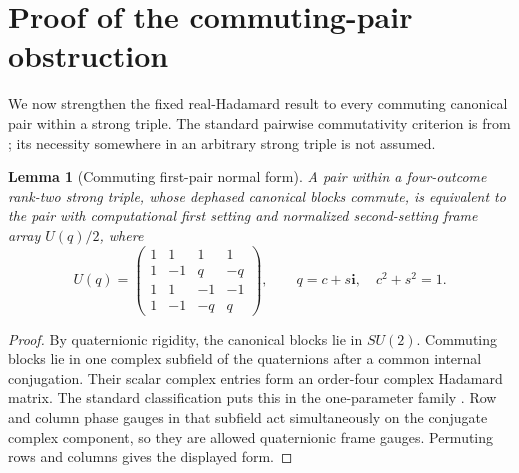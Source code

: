 \documentclass[11pt]{article}
\newtheorem{lemma}[theorem]{Lemma}
\begin{document}
\appendix
\section{Proof of the commuting-pair obstruction}\label{app:commutingproof}
We now strengthen the fixed real-Hadamard result to every commuting
canonical pair within a strong triple. The standard pairwise
commutativity criterion is from \cite{FKN}; its necessity somewhere in
an arbitrary strong triple is not assumed.

\begin{lemma}[Commuting first-pair normal form]\label{lem:commutingpair}
A pair within a four-outcome rank-two strong triple, whose dephased
canonical blocks commute, is equivalent to the pair with computational
first setting and normalized second-setting frame array $U(q)/2$, where
\[
 U(q)=\begin{pmatrix}
 1&1&1&1\\1&-1&q&-q\\1&1&-1&-1\\1&-1&-q&q
 \end{pmatrix},\qquad q=c+s\mathbf i,\quad c^2+s^2=1.
\]
\end{lemma}
\begin{proof}
By quaternionic rigidity, the canonical blocks lie in $SU(2)$.
Commuting blocks lie in one complex subfield of the quaternions after
a common internal conjugation. Their scalar complex entries form an
order-four complex Hadamard matrix. The standard classification puts
this in the one-parameter family \cite[Section~5.4]{TZ}. Row and column
phase gauges in that subfield act simultaneously on the conjugate
complex component, so they are allowed quaternionic frame gauges.
Permuting rows and columns gives the displayed form.
\end{proof}
\end{document}
